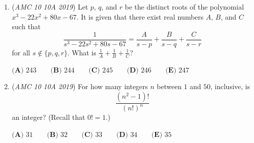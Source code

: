 \begin{enumerate}
 $\textbf{(A)}\ 5743 \qquad\textbf{(B)}\ 5885 \qquad\textbf{(C)}\ 5979 \qquad\textbf{(D)}\ 6001 \qquad\textbf{(E)}\ 6011$


	\item (\textit{AMC 10 10A 2019}) Let $p$, $q$, and $r$ be the distinct roots of the polynomial $x^3 - 22x^2 + 80x - 67$. It is given that there exist real numbers $A$, $B$, and $C$ such that 
 \[\dfrac{1}{s^3 - 22s^2 + 80s - 67} = \dfrac{A}{s-p} + \dfrac{B}{s-q} + \frac{C}{s-r}\]for all $s\not\in\{p,q,r\}$. What is $\frac1A+\frac1B+\frac1C$?


 $\textbf{(A) }243\qquad\textbf{(B) }244\qquad\textbf{(C) }245\qquad\textbf{(D) }246\qquad\textbf{(E) } 247$


	\item (\textit{AMC 10 10A 2019}) For how many integers $n$ between $1$ and $50$, inclusive, is 
 \[\frac{(n^2-1)!}{(n!)^{n}}\] an integer? (Recall that $0!=1$.)


 $\textbf{(A) } 31 \qquad \textbf{(B) } 32 \qquad \textbf{(C) } 33 \qquad \textbf{(D) } 34 \qquad \textbf{(E) } 35$


\end{enumerate}